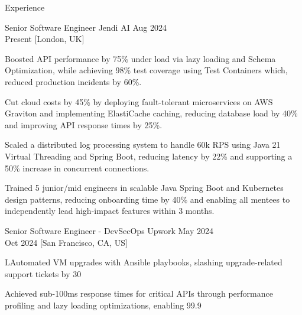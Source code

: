 \begin{rSection}{Experience}
    \begin{rSubsection}
        {Senior Software Engineer}
        {Jendi AI}
        {Aug 2024 \\ Present}
        [London, UK]
        \begin{rItemize}
            \item Boosted API performance by 75\% under load via lazy loading and Schema Optimization, while achieving 98\% test coverage using Test Containers which, reduced production incidents by 60\%.
            \item Cut cloud costs by 45\% by deploying fault-tolerant microservices on AWS Graviton and implementing ElastiCache caching, reducing database load by 40\% and improving API response times by 25\%.
            \item Scaled a distributed log processing system to handle 60k RPS using Java 21 Virtual Threading and Spring Boot, reducing latency by 22\% and supporting a 50\% increase in concurrent connections.
            \item Trained 5 junior/mid engineers in scalable Java Spring Boot and Kubernetes design patterns, reducing onboarding time by 40\% and enabling all mentees to independently lead high-impact features within 3 months.
        \end{rItemize}
    \end{rSubsection}

    \begin{rSubsection}
        {Senior Software Engineer - DevSecOps}
        {Upwork}
        {May 2024 \\ Oct 2024}
        [San Francisco, CA, US]
        \begin{rItemize}
            \item LAutomated VM upgrades with Ansible playbooks, slashing upgrade-related support tickets by 30%
            \item Achieved sub-100ms response times for critical APIs through performance profiling and lazy loading optimizations, enabling 99.9%
        \end{rItemize}
    \end{rSubsection}


\end{rSection}
